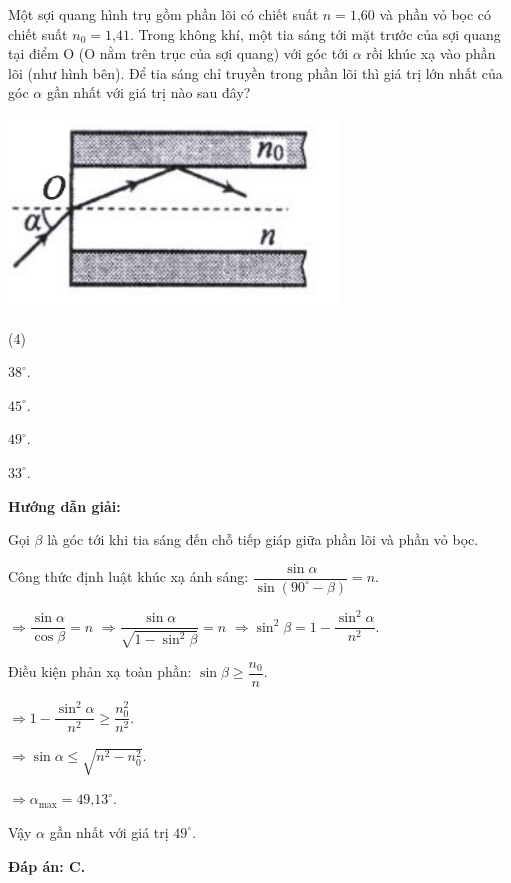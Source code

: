 {Một sợi quang hình trụ gồm phần lõi có chiết suất $n=\text{1,60}$ và phần vỏ bọc có chiết suất $n_0=\text{1,41}$. Trong không khí, một tia sáng tới mặt trước của sợi quang tại điểm O (O nằm trên trục của sợi quang) với góc tới $\alpha$ rồi khúc xạ vào phần lõi (như hình bên). Để tia sáng chỉ truyền trong phần lõi thì giá trị lớn nhất của góc $\alpha$ gần nhất với giá trị nào sau đây?
\begin{center}
	\includegraphics[scale=0.6]{../figs/VN11-PH-35-L-024-1-h62.jpg}
\end{center}
\begin{mcq}(4)
	\item $\text{38}^\circ$.
	\item $\text{45}^\circ$.
	\item $\text{49}^\circ$.
	\item $\text{33}^\circ$. 
\end{mcq}}
{\begin{center}
	\textbf{Hướng dẫn giải:}
\end{center}

Gọi $\beta$ là góc tới khi tia sáng đến chỗ tiếp giáp giữa phần lõi và phần vỏ bọc. 

Công thức định luật khúc xạ ánh sáng: $\dfrac{\sin \alpha }{\sin \left(90^\circ-\beta \right)}=n$.

$\Rightarrow \dfrac{\sin \alpha }{\cos \beta }=n$
$\Rightarrow \dfrac{\sin \alpha }{\sqrt{1-\sin^2\beta} }=n$
$\Rightarrow \sin^2\beta=1-\dfrac{\sin^2 \alpha }{n^2}$.

Điều kiện phản xạ toàn phần: $\sin \beta\geq \dfrac{n_0}{n}$.

$\Rightarrow 1-\dfrac{\sin^2 \alpha }{n^2}\geq \dfrac{n^2_0}{n^2}$.

$\Rightarrow \sin \alpha \leq \sqrt{n^2-n^2_0}$.

$\Rightarrow \alpha_\text{max} =\text{49,13}^\circ$.

Vậy $\alpha$ gần nhất với giá trị $\text{49}^\circ$.

\textbf{Đáp án: C.}

}

